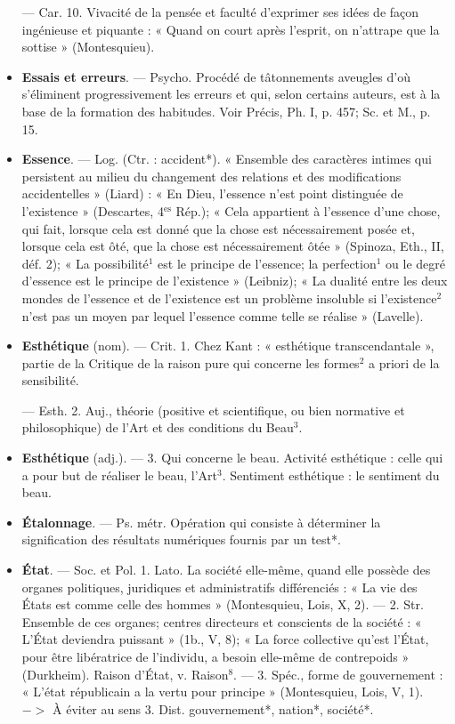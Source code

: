 \begin{itemize}[leftmargin=1cm, label=, itemsep=1pt]
— Car. 10. Vivacité de la pensée
et faculté d'exprimer ses idées de
façon ingénieuse et piquante :
« Quand on court après l'esprit, on
n'attrape que la sottise » (Montesquieu).

\item {\bf Essais et erreurs}. — Psycho. Procédé
de tâtonnements aveugles d’où s’éliminent progressivement les erreurs
et qui, selon certains auteurs, est à
la base de la formation des habitudes. Voir Précis, Ph. I, p. 457; Sc.
et M., p. 15.

\item {\bf Essence}. — Log. (Ctr. : accident*).
« Ensemble des caractères intimes
qui persistent au milieu du changement des relations et des modifications accidentelles » (Liard) : « En
Dieu, l'essence n’est point distinguée
de l’existence » (Descartes, 4$^\text{es}$ Rép.);
« Cela appartient à l’essence d’une
chose, qui fait, lorsque cela est donné
que la chose est nécessairement
posée et, lorsque cela est ôté, que la
chose est nécessairement ôtée »
(Spinoza, Eth., II, déf. 2); « La
possibilité$^1$ est le principe de l’essence; la perfection$^1$ ou le degré
d'essence est le principe de l'existence » (Leibniz); « La dualité entre
les deux mondes de l'essence et de
l'existence est un problème insoluble si l'existence$^2$ n’est pas un
moyen par lequel l'essence comme
telle se réalise » (Lavelle).

\item {\bf Esthétique} (nom). — Crit. 1. Chez
Kant : « esthétique transcendantale », partie de la Critique de la
raison pure qui concerne les formes$^2$
a priori de la sensibilité.

— Esth. 2. Auj., théorie (positive et scientifique, ou bien normative et philosophique) de l’Art et
des conditions du Beau$^3$.

\item {\bf Esthétique} (adj.). — 3. Qui concerne
le beau. Activité esthétique : celle qui
a pour but de réaliser le beau, l’Art$^3$.
Sentiment esthétique : le sentiment
du beau.

\item {\bf Étalonnage}. — Ps. métr. Opération
qui consiste à déterminer la signification des résultats numériques
fournis par un test*.

\item {\bf État}. — Soc. et Pol. 1. Lato. La société
elle-même, quand elle possède des
organes politiques, juridiques et
administratifs différenciés : « La vie
des États est comme celle des hommes » (Montesquieu, Lois, X, 2). —
2. Str. Ensemble de ces organes;
centres directeurs et conscients de
la société : « L'État deviendra puissant »
(1b., V, 8); « La force collective qu'est l'État, pour être libératrice de l'individu, a besoin elle-même de contrepoids » (Durkheim).
Raison d'État, v. Raison$^8$. — 3.
Spéc., forme de gouvernement :
« L'état républicain a la vertu pour
principe » (Montesquieu, Lois, V, 1).
$->$ À éviter au sens 3. Dist. gouvernement*, nation*, société*.


\end{itemize}
